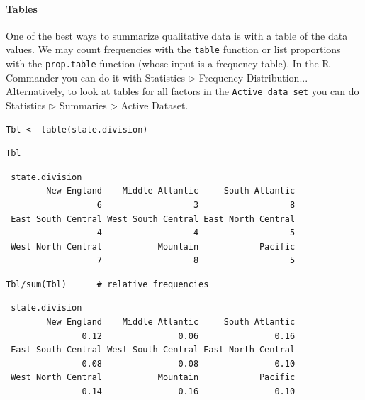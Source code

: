 \documentclass[captions=tableheading]{scrbook}
\begin{document}
\label{sub:Displaying-Qualitative-Data}

\paragraph*{Tables}
\label{par:Tables}

One of the best ways to summarize qualitative data is with a table of the data values. We may count frequencies with the \texttt{table} function or list proportions with the \texttt{prop.table} function (whose input is a frequency table). In the \textsf{R} Commander you can do it with \textsf{Statistics} \textsf{\(\triangleright\)} \textsf{Frequency Distribution}... Alternatively, to look at tables for all factors in the \texttt{Active data set} you can do \textsf{Statistics} \textsf{\(\triangleright\)} \textsf{Summaries} \textsf{\(\triangleright\)} \textsf{Active Dataset}.


\begin{verbatim}
Tbl <- table(state.division)
\end{verbatim}


\begin{verbatim}
Tbl
\end{verbatim}

\begin{verbatim}
 state.division
        New England    Middle Atlantic     South Atlantic 
                  6                  3                  8 
 East South Central West South Central East North Central 
                  4                  4                  5 
 West North Central           Mountain            Pacific 
                  7                  8                  5
\end{verbatim}


\begin{verbatim}
Tbl/sum(Tbl)      # relative frequencies
\end{verbatim}

\begin{verbatim}
 state.division
        New England    Middle Atlantic     South Atlantic 
               0.12               0.06               0.16 
 East South Central West South Central East North Central 
               0.08               0.08               0.10 
 West North Central           Mountain            Pacific 
               0.14               0.16               0.10
\end{verbatim}
\end{document}
